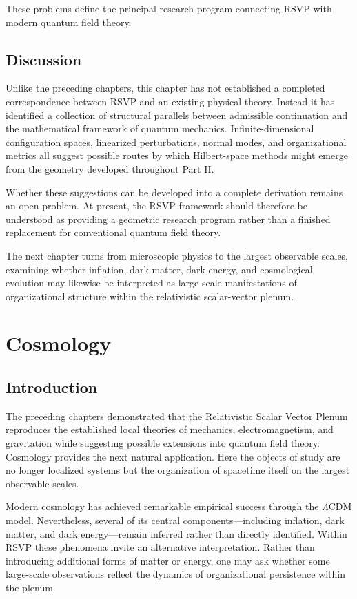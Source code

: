 \documentclass[11pt,oneside]{book}
\numberwithin{equation}{chapter}
\theoremstyle{definition}
\theoremstyle{plain}
\begin{document}
These problems define the principal research program connecting RSVP with
modern quantum field theory.

\section{Discussion}

Unlike the preceding chapters, this chapter has not established a completed
correspondence between RSVP and an existing physical theory. Instead it has
identified a collection of structural parallels between admissible
continuation and the mathematical framework of quantum mechanics.
Infinite-dimensional configuration spaces, linearized perturbations, normal
modes, and organizational metrics all suggest possible routes by which
Hilbert-space methods might emerge from the geometry developed throughout
Part II.

Whether these suggestions can be developed into a complete derivation
remains an open problem. At present, the RSVP framework should therefore be
understood as providing a geometric research program rather than a finished
replacement for conventional quantum field theory.

The next chapter turns from microscopic physics to the largest observable
scales, examining whether inflation, dark matter, dark energy, and
cosmological evolution may likewise be interpreted as large-scale
manifestations of organizational structure within the relativistic
scalar-vector plenum.

\chapter{Cosmology}

\section{Introduction}

The preceding chapters demonstrated that the Relativistic Scalar Vector
Plenum reproduces the established local theories of mechanics,
electromagnetism, and gravitation while suggesting possible extensions into
quantum field theory. Cosmology provides the next natural application. Here
the objects of study are no longer localized systems but the organization of
spacetime itself on the largest observable scales.

Modern cosmology has achieved remarkable empirical success through the
\(\Lambda\)CDM model. Nevertheless, several of its central
components---including inflation, dark matter, and dark energy---remain
inferred rather than directly identified. Within RSVP these phenomena invite
an alternative interpretation. Rather than introducing additional forms of
matter or energy, one may ask whether some large-scale observations reflect
the dynamics of organizational persistence within the plenum.
\end{document}
